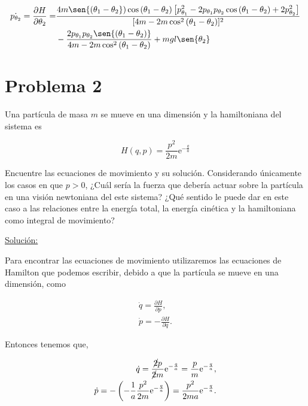 \documentclass[a4paper,10pt]{article}
\numberwithin{equation}{section}
\newcommand{\euler}{\mathrm{e}}
\begin{document}
\begin{align}
\begin{split}
 \dot{p_{\theta_2}} = \frac{\partial H}{\partial \theta_2} = 
 &\frac{4m\sen{(\theta_1 - \theta_2})\cos{(\theta_1 - \theta_2)}
 \left[p_{\theta_1}^2 - 2p_{\theta_1}p_{\theta_2}\cos{(\theta_1 - \theta_2)} + 2p_{\theta_2}^2\right]}{[4m - 2m\cos^2{(\theta_1 - \theta_2)}]^2} \\
 &- \frac{2p_{\theta_1}p_{\theta_2}\sen{(\theta_1 - \theta_2)}}{4m - 2m\cos^2{(\theta_1 - \theta_2)}} 
 + mgl\sen{\theta_2}
\end{split}
\end{align}

\section{Problema 2}

Una partícula de masa $m$ se mueve en una dimensión y la hamiltoniana del sistema 
es 

$$
H(q,p) = \frac{p^2}{2m}\euler^{-\frac{q}{a}}
$$

Encuentre las ecuaciones de movimiento y su solución. Considerando únicamente los casos 
en que $p>0$, ¿Cuál sería la fuerza que debería actuar sobre la partícula en una visión
newtoniana del este sistema? ¿Qué sentido le puede dar en este caso a las relaciones entre 
la energía total, la energía cinética y la hamiltoniana como integral de movimiento?

\vspace{.3cm}

\underline{Solución:} \vspace{.3cm}

Para encontrar las ecuaciones de movimiento utilizaremos las ecuaciones de Hamilton 
que podemos escribir, debido a que la partícula se mueve en una dimensión, como

\begin{align}
 \dot{q} = \frac{\partial H}{\partial p}, \\
 \dot{p} = - \frac{\partial H}{\partial q}.
\end{align}

Entonces tenemos que,

\begin{align}
\label{eq:2qdot1}
 \dot{q} = \frac{\cancel{2}p}{\cancel{2}m}\euler^{-\frac{q}{a}}
 = \frac{p}{m}\euler^{-\frac{q}{a}}, \\
\label{eq:2pdot1}
 \dot{p} = - \left(- \frac{1}{a}\frac{p^2}{2m}\euler^{-\frac{q}{a}}\right)
 = \frac{p^2}{2ma}\euler^{-\frac{q}{a}}.
\end{align}
\end{document}
